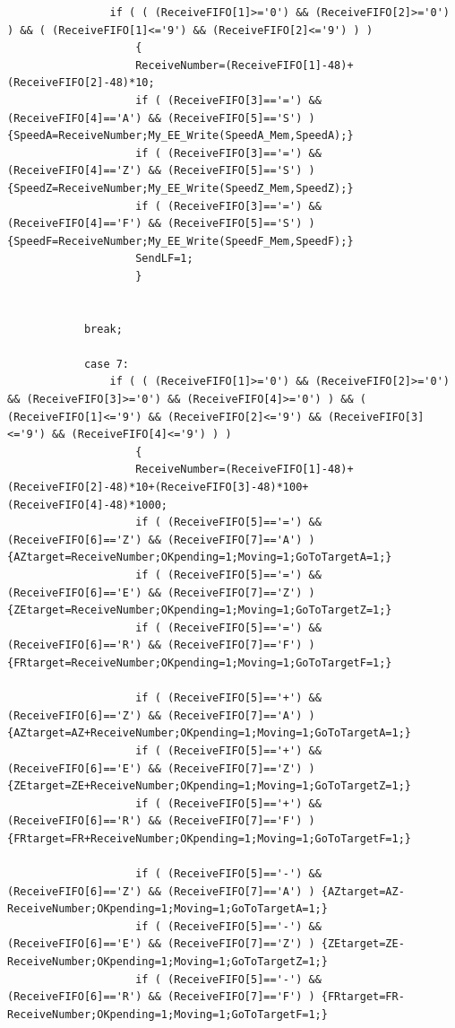 \documentclass[
  a4paper,
  twoside,
  titlepage,
  11pt]{article}
\numberwithin{equation}{section}
\numberwithin{figure}{section}
\numberwithin{table}{section}
\begin{document}
\begin{verbatim}
                if ( ( (ReceiveFIFO[1]>='0') && (ReceiveFIFO[2]>='0') ) && ( (ReceiveFIFO[1]<='9') && (ReceiveFIFO[2]<='9') ) )
                    {
                    ReceiveNumber=(ReceiveFIFO[1]-48)+(ReceiveFIFO[2]-48)*10;
                    if ( (ReceiveFIFO[3]=='=') && (ReceiveFIFO[4]=='A') && (ReceiveFIFO[5]=='S') ) {SpeedA=ReceiveNumber;My_EE_Write(SpeedA_Mem,SpeedA);}
                    if ( (ReceiveFIFO[3]=='=') && (ReceiveFIFO[4]=='Z') && (ReceiveFIFO[5]=='S') ) {SpeedZ=ReceiveNumber;My_EE_Write(SpeedZ_Mem,SpeedZ);}
                    if ( (ReceiveFIFO[3]=='=') && (ReceiveFIFO[4]=='F') && (ReceiveFIFO[5]=='S') ) {SpeedF=ReceiveNumber;My_EE_Write(SpeedF_Mem,SpeedF);}
                    SendLF=1;
                    }


            break;

            case 7:
                if ( ( (ReceiveFIFO[1]>='0') && (ReceiveFIFO[2]>='0') && (ReceiveFIFO[3]>='0') && (ReceiveFIFO[4]>='0') ) && ( (ReceiveFIFO[1]<='9') && (ReceiveFIFO[2]<='9') && (ReceiveFIFO[3]<='9') && (ReceiveFIFO[4]<='9') ) )
                    {
                    ReceiveNumber=(ReceiveFIFO[1]-48)+(ReceiveFIFO[2]-48)*10+(ReceiveFIFO[3]-48)*100+(ReceiveFIFO[4]-48)*1000;
                    if ( (ReceiveFIFO[5]=='=') && (ReceiveFIFO[6]=='Z') && (ReceiveFIFO[7]=='A') ) {AZtarget=ReceiveNumber;OKpending=1;Moving=1;GoToTargetA=1;}
                    if ( (ReceiveFIFO[5]=='=') && (ReceiveFIFO[6]=='E') && (ReceiveFIFO[7]=='Z') ) {ZEtarget=ReceiveNumber;OKpending=1;Moving=1;GoToTargetZ=1;}
                    if ( (ReceiveFIFO[5]=='=') && (ReceiveFIFO[6]=='R') && (ReceiveFIFO[7]=='F') ) {FRtarget=ReceiveNumber;OKpending=1;Moving=1;GoToTargetF=1;}

                    if ( (ReceiveFIFO[5]=='+') && (ReceiveFIFO[6]=='Z') && (ReceiveFIFO[7]=='A') ) {AZtarget=AZ+ReceiveNumber;OKpending=1;Moving=1;GoToTargetA=1;}
                    if ( (ReceiveFIFO[5]=='+') && (ReceiveFIFO[6]=='E') && (ReceiveFIFO[7]=='Z') ) {ZEtarget=ZE+ReceiveNumber;OKpending=1;Moving=1;GoToTargetZ=1;}
                    if ( (ReceiveFIFO[5]=='+') && (ReceiveFIFO[6]=='R') && (ReceiveFIFO[7]=='F') ) {FRtarget=FR+ReceiveNumber;OKpending=1;Moving=1;GoToTargetF=1;}

                    if ( (ReceiveFIFO[5]=='-') && (ReceiveFIFO[6]=='Z') && (ReceiveFIFO[7]=='A') ) {AZtarget=AZ-ReceiveNumber;OKpending=1;Moving=1;GoToTargetA=1;}
                    if ( (ReceiveFIFO[5]=='-') && (ReceiveFIFO[6]=='E') && (ReceiveFIFO[7]=='Z') ) {ZEtarget=ZE-ReceiveNumber;OKpending=1;Moving=1;GoToTargetZ=1;}
                    if ( (ReceiveFIFO[5]=='-') && (ReceiveFIFO[6]=='R') && (ReceiveFIFO[7]=='F') ) {FRtarget=FR-ReceiveNumber;OKpending=1;Moving=1;GoToTargetF=1;}


\end{verbatim}
\end{document}
